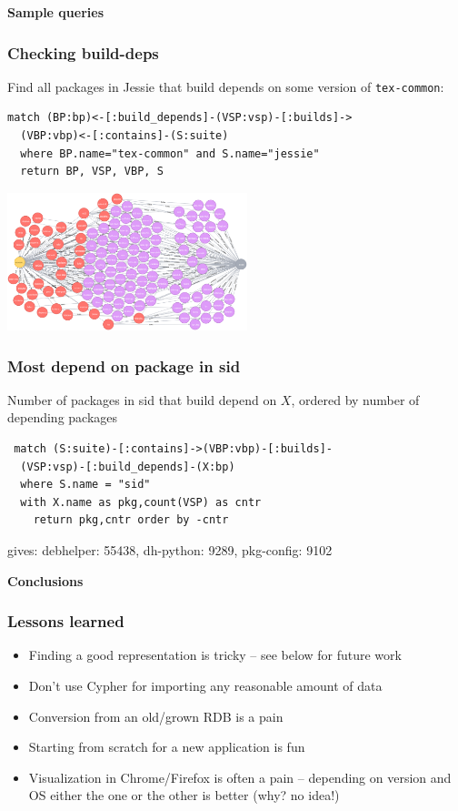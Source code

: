 \documentclass[hyperref]{beamer}
\newcommand{\cutin}[1]{%
\begin{frame}[c]\begin{center}{\Large\bf\color{myblue}#1}\end{center}\end{frame}}
\def\bis{\\[\bigskipamount]}
\begin{document}
\cutin{Sample queries}

\begin{frame}[fragile]
  \frametitle{Checking build-deps}

  Find all packages in Jessie that build depends on some version of
  \texttt{tex-common}:

\begin{lstlisting}
match (BP:bp)<-[:build_depends]-(VSP:vsp)-[:builds]->
  (VBP:vbp)<-[:contains]-(S:suite)
  where BP.name="tex-common" and S.name="jessie"
  return BP, VSP, VBP, S
\end{lstlisting}
\pause
\begin{center}
  \includegraphics[height=4cm]{bd-on-tex-common.png}
\end{center}
\end{frame}

\begin{frame}[fragile]
  \frametitle{Most depend on package in sid}
  Number of packages in sid that build depend on $X$, ordered by
  number of depending packages
  \begin{lstlisting}
 match (S:suite)-[:contains]->(VBP:vbp)-[:builds]-
  (VSP:vsp)-[:build_depends]-(X:bp) 
  where S.name = "sid" 
  with X.name as pkg,count(VSP) as cntr 
    return pkg,cntr order by -cntr
\end{lstlisting}
\pause
gives: debhelper: 55438, dh-python: 9289, pkg-config: 9102
\end{frame}

\cutin{Conclusions}

\begin{frame}
  \frametitle{Lessons learned}
  \begin{itemize}
  \item Finding a good representation is tricky -- see below for
    future work\bis
  \item Don't use Cypher for importing any reasonable amount of
    data\bis
  \item Conversion from an old/grown RDB is a pain\bis
  \item Starting from scratch for a new application is fun\bis
  \item Visualization in Chrome/Firefox is often a pain -- depending
    on version and OS either the one or the other is better (why? no
    idea!) 
  \end{itemize}
\end{frame}
\end{document}
